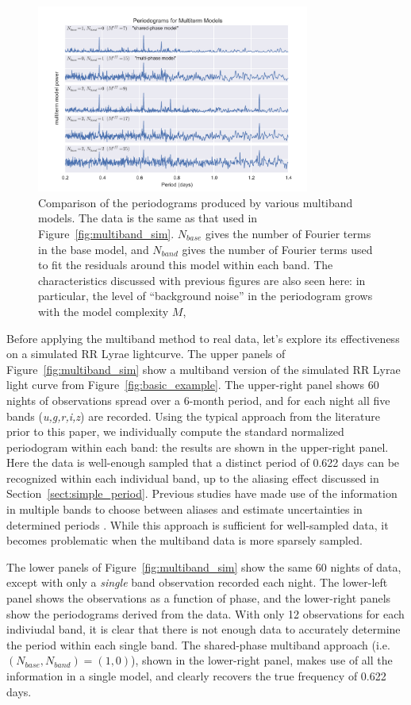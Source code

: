 \documentclass[12pt,preprint]{aastex}
\newcommand{\Fig}[1]{Figure~\ref{fig:#1}}
\newcommand{\fig}[1]{\Fig{#1}}
\newcommand{\figlabel}[1]{\label{fig:#1}}
\newcommand{\Sect}[1]{Section~\ref{sect:#1}}
\newcommand{\sect}[1]{\Sect{#1}}
\begin{document}
\begin{figure}
  \centering
  \includegraphics[width=0.8\textwidth]{fig06.pdf}
  \caption{
    Comparison of the periodograms produced by various multiband models.
    The data is the same as that used in \fig{multiband_sim}. $N_{base}$ gives
    the number of Fourier terms in the base model, and $N_{band}$ gives the
    number of Fourier terms used to fit the residuals around this model within
    each band. The characteristics discussed with previous figures are also
    seen here: in particular, the level of ``background noise'' in the
    periodogram grows with the model complexity $M$,
  } 
  \figlabel{multiband_models}
\end{figure}

Before applying the multiband method to real data, let's explore its effectiveness on a simulated RR Lyrae lightcurve.
The upper panels of \fig{multiband_sim} show a multiband version of the simulated RR Lyrae light curve from \fig{basic_example}.
The upper-right panel shows 60 nights of observations spread over a 6-month period, and for each night all five bands ({\it u,g,r,i,z}) are recorded.
Using the typical approach from the literature prior to this paper, we individually compute the standard normalized periodogram within each band: the results are shown in the upper-right panel.
Here the data is well-enough sampled that a distinct period of 0.622 days can be recognized within each individual band, up to the aliasing effect discussed in \sect{simple_period}.
Previous studies have made use of the information in multiple bands to choose between aliases and estimate uncertainties in determined periods \citep[e.g.][]{Oluseyi12,Sesar2010}.
While this approach is sufficient for well-sampled data, it becomes problematic when the multiband data is more sparsely sampled.

The lower panels of \fig{multiband_sim} show the same 60 nights of data, except with only a {\it single} band observation recorded each night. The lower-left panel shows the observations as a function of phase, and the lower-right panels show the periodograms derived from the data. With only 12 observations for each indiviudal band, it is clear that there is not enough data to accurately determine the period within each single band. The shared-phase multiband approach (i.e. $(N_{base},N_{band})=(1,0)$), shown in the lower-right panel, makes use of all the information in a single model, and clearly recovers the true frequency of 0.622 days.
\end{document}
